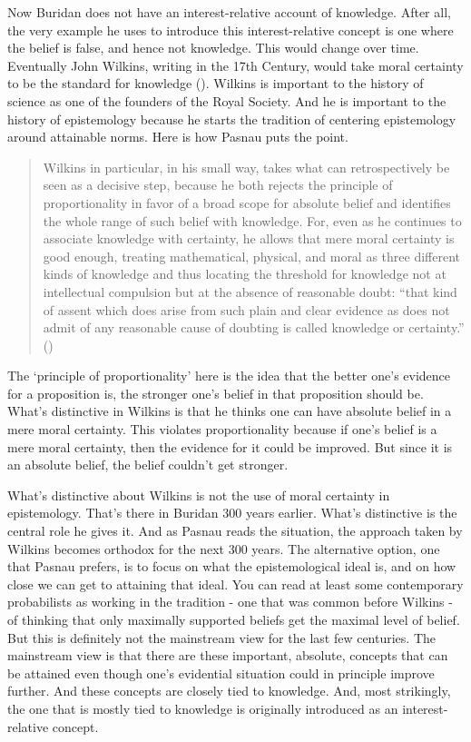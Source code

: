 \documentclass[
  10pt,
  letterpaper,
  twoside]{scrbook}
\begin{document}
Now Buridan does not have an interest-relative account of knowledge.
After all, the very example he uses to introduce this interest-relative
concept is one where the belief is false, and hence not knowledge. This
would change over time. Eventually John Wilkins, writing in the 17th
Century, would take moral certainty to be the standard for knowledge
(). Wilkins is important to
the history of science as one of the founders of the Royal Society. And
he is important to the history of epistemology because he starts the
tradition of centering epistemology around attainable norms. Here is how
Pasnau puts the point.

\begin{quote}
Wilkins in particular, in his small way, takes what can retrospectively
be seen as a decisive step, because he both rejects the principle of
proportionality in favor of a broad scope for absolute belief and
identifies the whole range of such belief with knowledge. For, even as
he continues to associate knowledge with certainty, he allows that mere
moral certainty is good enough, treating mathematical, physical, and
moral as three different kinds of knowledge and thus locating the
threshold for knowledge not at intellectual compulsion but at the
absence of reasonable doubt: ``that kind of assent which does arise from
such plain and clear evidence as does not admit of any reasonable cause
of doubting is called knowledge or certainty.''
()
\end{quote}

The `principle of proportionality' here is the idea that the better
one's evidence for a proposition is, the stronger one's belief in that
proposition should be. What's distinctive in Wilkins is that he thinks
one can have absolute belief in a mere moral certainty. This violates
proportionality because if one's belief is a mere moral certainty, then
the evidence for it could be improved. But since it is an absolute
belief, the belief couldn't get stronger.

What's distinctive about Wilkins is not the use of moral certainty in
epistemology. That's there in Buridan 300 years earlier. What's
distinctive is the central role he gives it. And as Pasnau reads the
situation, the approach taken by Wilkins becomes orthodox for the next
300 years. The alternative option, one that Pasnau prefers, is to focus
on what the epistemological ideal is, and on how close we can get to
attaining that ideal. You can read at least some contemporary
probabilists as working in the tradition - one that was common before
Wilkins - of thinking that only maximally supported beliefs get the
maximal level of belief. But this is definitely not the mainstream view
for the last few centuries. The mainstream view is that there are these
important, absolute, concepts that can be attained even though one's
evidential situation could in principle improve further. And these
concepts are closely tied to knowledge. And, most strikingly, the one
that is mostly tied to knowledge is originally introduced as an
interest-relative concept.
\end{document}
